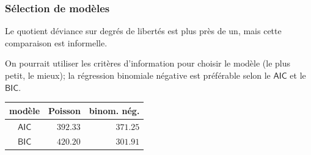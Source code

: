 \documentclass{beamer}
\begin{document}
\begin{frame}[fragile]
\frametitle{Sélection de modèles}
\bi
\item Le quotient déviance sur degrés de libertés est plus près de un, mais cette comparaison est informelle.
\item On pourrait utiliser les critères d'information pour choisir le modèle (le plus petit, le mieux); la régression binomiale négative est préférable selon le $\mathsf{AIC}$ et le $\mathsf{BIC}$.
\ei
\begin{center}
\begin{tabular}{crr}
\toprule
 modèle & \multicolumn{1}{c}{Poisson} & \multicolumn{1}{c}{binom. nég.}
 \\ \midrule
$\mathsf{AIC}$ & $392.33$ & $371.25$ \\
 $\mathsf{BIC}$& $420.20$ & $301.91$ \\\bottomrule
\end{tabular}
\end{center}


\end{frame}
\end{document}
